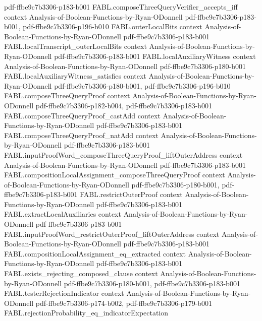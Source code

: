 \begin{theorem}
  {pdf-ffbe9c7b3306-p183-b001}
\proofstep
  {FABL.composeThreeQueryVerifier_accepts_iff}
  {context}
  {Analysis-of-Boolean-Functions-by-Ryan-ODonnell}
  {pdf-ffbe9c7b3306-p183-b001,
    pdf-ffbe9c7b3306-p196-b010}
\proofstep
  {FABL.outerLocalBits}
  {context}
  {Analysis-of-Boolean-Functions-by-Ryan-ODonnell}
  {pdf-ffbe9c7b3306-p183-b001}
\proofstep
  {FABL.localTranscript_outerLocalBits}
  {context}
  {Analysis-of-Boolean-Functions-by-Ryan-ODonnell}
  {pdf-ffbe9c7b3306-p183-b001}
\proofstep
  {FABL.localAuxiliaryWitness}
  {context}
  {Analysis-of-Boolean-Functions-by-Ryan-ODonnell}
  {pdf-ffbe9c7b3306-p180-b001}
\proofstep
  {FABL.localAuxiliaryWitness_satisfies}
  {context}
  {Analysis-of-Boolean-Functions-by-Ryan-ODonnell}
  {pdf-ffbe9c7b3306-p180-b001,
    pdf-ffbe9c7b3306-p196-b010}
\proofstep
  {FABL.composeThreeQueryProof}
  {context}
  {Analysis-of-Boolean-Functions-by-Ryan-ODonnell}
  {pdf-ffbe9c7b3306-p182-b004,
    pdf-ffbe9c7b3306-p183-b001}
\proofstep
  {FABL.composeThreeQueryProof_castAdd}
  {context}
  {Analysis-of-Boolean-Functions-by-Ryan-ODonnell}
  {pdf-ffbe9c7b3306-p183-b001}
\proofstep
  {FABL.composeThreeQueryProof_natAdd}
  {context}
  {Analysis-of-Boolean-Functions-by-Ryan-ODonnell}
  {pdf-ffbe9c7b3306-p183-b001}
\proofstep
  {FABL.inputProofWord_composeThreeQueryProof_liftOuterAddress}
  {context}
  {Analysis-of-Boolean-Functions-by-Ryan-ODonnell}
  {pdf-ffbe9c7b3306-p183-b001}
\proofstep
  {FABL.compositionLocalAssignment_composeThreeQueryProof}
  {context}
  {Analysis-of-Boolean-Functions-by-Ryan-ODonnell}
  {pdf-ffbe9c7b3306-p180-b001,
    pdf-ffbe9c7b3306-p183-b001}
\proofstep
  {FABL.restrictOuterProof}
  {context}
  {Analysis-of-Boolean-Functions-by-Ryan-ODonnell}
  {pdf-ffbe9c7b3306-p183-b001}
\proofstep
  {FABL.extractLocalAuxiliaries}
  {context}
  {Analysis-of-Boolean-Functions-by-Ryan-ODonnell}
  {pdf-ffbe9c7b3306-p183-b001}
\proofstep
  {FABL.inputProofWord_restrictOuterProof_liftOuterAddress}
  {context}
  {Analysis-of-Boolean-Functions-by-Ryan-ODonnell}
  {pdf-ffbe9c7b3306-p183-b001}
\proofstep
  {FABL.compositionLocalAssignment_eq_extracted}
  {context}
  {Analysis-of-Boolean-Functions-by-Ryan-ODonnell}
  {pdf-ffbe9c7b3306-p183-b001}
\proofstep
  {FABL.exists_rejecting_composed_clause}
  {context}
  {Analysis-of-Boolean-Functions-by-Ryan-ODonnell}
  {pdf-ffbe9c7b3306-p180-b001,
    pdf-ffbe9c7b3306-p183-b001}
\proofstep
  {FABL.testerRejectionIndicator}
  {context}
  {Analysis-of-Boolean-Functions-by-Ryan-ODonnell}
  {pdf-ffbe9c7b3306-p174-b002,
    pdf-ffbe9c7b3306-p179-b001}
\proofstep
  {FABL.rejectionProbability_eq_indicatorExpectation}

\end{theorem}
